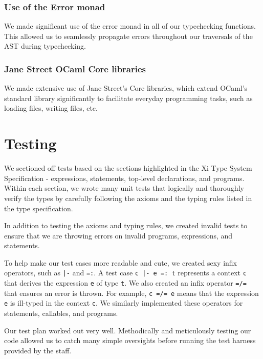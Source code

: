 \documentclass{hw}
\begin{document}
\subsubsection{Use of the Error monad}
We made significant use of the error monad in all of our typechecking functions. This
allowed us to seamlessly propagate errors throughout our traversals of the AST during
typechecking.

\subsubsection{Jane Street OCaml Core libraries}
We made extensive use of Jane Street's Core libraries, which extend OCaml's standard
library significantly to facilitate everyday programming tasks, such as loading files,
writing files, etc.

\section{Testing}\label{sec:testing}
We sectioned off tests based on the sections highlighted in the Xi Type System Specification - expressions, statements, top-level declarations, and programs. Within each section, we wrote many unit tests that logically and thoroughly verify the types by carefully following the axioms and the typing rules listed in the type specification.

In addition to testing the axioms and typing rules, we created invalid tests to ensure that we are throwing errors on invalid programs, expressions, and statements.

To help make our test cases more readable and cute, we created sexy infix operators, such as \texttt{|-} and \texttt{=:}. A test case \texttt{c |- e =: t} represents a context \texttt{c} that derives the expression \texttt{e} of type \texttt{t}. We also created an infix operator \texttt{=/=} that ensures an error is thrown. For example, \texttt{c =/= e} means that the expression \texttt{e} is ill-typed in the context \texttt{c}. We similarly implemented these operators for statements, callables, and programs.

Our test plan worked out very well. Methodically and meticulously testing our code allowed us to catch many simple oversights before running the test harness provided by the staff.
\end{document}
